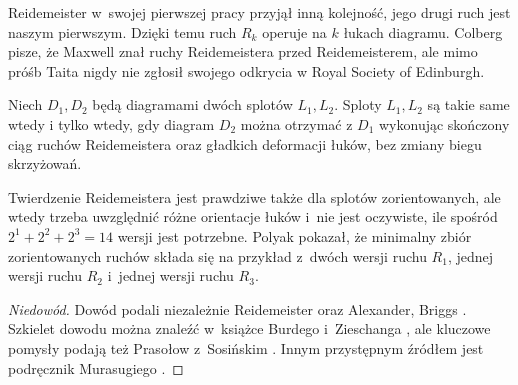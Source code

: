 Reidemeister w~swojej pierwszej pracy przyjął inną kolejność, jego drugi ruch jest naszym pierwszym.
Dzięki temu ruch $R_k$ operuje na $k$ łukach diagramu.
Colberg \cite[s. 6]{colberg2013} pisze, że Maxwell znał ruchy Reidemeistera przed Reidemeisterem, ale mimo próśb Taita nigdy nie zgłosił swojego odkrycia w Royal Society of Edinburgh.
%
%

\begin{theorem}[Reidemeister, 1927]
\label{thm:reidemeister}%
%
%
    Niech $D_1, D_2$ będą diagramami dwóch splotów $L_1, L_2$.
    Sploty $L_1, L_2$ są takie same wtedy i tylko wtedy, gdy diagram $D_2$ można otrzymać z $D_1$ wykonując skończony ciąg ruchów Reidemeistera oraz gładkich deformacji łuków, bez zmiany biegu skrzyżowań.
\end{theorem}

Twierdzenie Reidemeistera jest prawdziwe także dla splotów zorientowanych, ale wtedy trzeba uwzględnić różne orientacje łuków i~nie jest oczywiste, ile spośród $2^1 + 2^2 + 2^3 = 14$ wersji jest potrzebne.
Polyak \cite{polyak2010} pokazał, że minimalny zbiór zorientowanych ruchów składa się na przykład z~dwóch wersji ruchu $R_1$, jednej wersji ruchu $R_2$ i~jednej wersji ruchu $R_3$.
%

\begin{proof}[Niedowód]
Dowód podali niezależnie Reidemeister \cite{reidemeister1927} oraz Alexander, Briggs \cite{alexander1927}.
%
%
%
    Szkielet dowodu można znaleźć w~książce Burdego i~Zieschanga \cite[s. 9-11]{burde2014}, ale kluczowe pomysły podają też Prasołow z~Sosińskim \cite[s. 11-12]{prasolov1997}.
%
%
%
%
    Innym przystępnym źródłem jest podręcznik Murasugiego \cite[s. 50-56]{murasugi1996}.
%
\end{proof}

